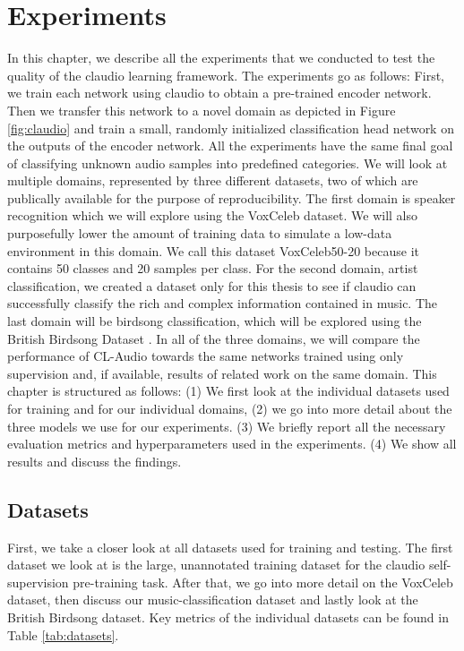 
\chapter{Experiments}\label{chapter:experiments}

In this chapter, we describe all the experiments that we conducted to test the quality of the \gls{claudio} learning framework. The experiments go as follows: First, we train each network using \gls{claudio} to obtain a pre-trained encoder network. Then we transfer this network to a novel domain as depicted in Figure \ref{fig:claudio} and train a small, randomly initialized classification head network on the outputs of the encoder network. All the experiments have the same final goal of classifying unknown audio samples into predefined categories. We will look at multiple domains, represented by three different datasets, two of which are publically available for the purpose of reproducibility. The first domain is speaker recognition which we will explore using the VoxCeleb \cite{Chung18b} dataset. We will also purposefully lower the amount of training data to simulate a low-data environment in this domain. We call this dataset VoxCeleb50-20 because it contains 50 classes and 20 samples per class. For the second domain, artist classification, we created a dataset only for this thesis to see if \gls{claudio} can successfully classify the rich and complex information contained in music. The last domain will be birdsong classification, which will be explored using the British Birdsong Dataset \cite{stowell2014xccoverbl}. In all of the three domains, we will compare the performance of CL-Audio towards the same networks trained using only supervision and, if available, results of related work on the same domain. This chapter is structured as follows: (1) We first look at the individual datasets used for training and for our individual domains, (2) we go into more detail about the three models we use for our experiments. (3) We briefly report all the necessary evaluation metrics and hyperparameters used in the experiments. (4) We show all results and discuss the findings.

\section{Datasets}

First, we take a closer look at all datasets used for training and testing. The first dataset we look at is the large, unannotated training dataset for the \gls{claudio} self-supervision pre-training task. After that, we go into more detail on the VoxCeleb dataset, then discuss our music-classification dataset and lastly look at the British Birdsong dataset. Key metrics of the individual datasets can be found in Table \ref{tab:datasets}.


